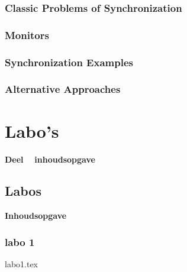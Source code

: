 \documentclass[a4paper,11pt]{report}
\newcommand\PartialTocChapter{%
\startcontents[chapters]\vbox{\bf\Large Inhoudsopgave }
\printcontents[chapters]{}{1}{\setcounter{tocdepth}{1}}
\newpage
}%
\newcommand\PartialTocPart{%
\startcontents[parts]\vbox{\bf\Large Deel \thepart ~ inhoudsopgave}
\printcontents[parts]{}{0}{\setcounter{tocdepth}{1}}}%
\begin{document}
\section{Classic Problems of Synchronization}
\section{Monitors}
\section{Synchronization Examples}
\section{Alternative Approaches}


\part{Labo's}

\PartialTocPart

\chapter{Labos}

\PartialTocChapter

\section{labo 1}
{labo1.tex}




%



\end{document}
